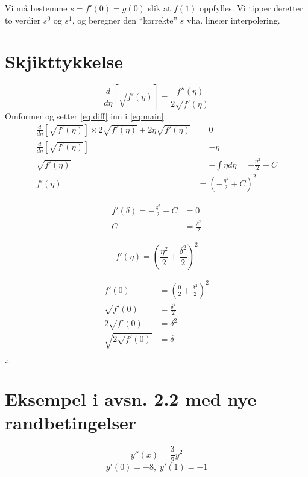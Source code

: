 Vi må bestemme $s = f'(0) = g(0)$ slik at $f(1)$ oppfylles. Vi tipper deretter to verdier $s^0$ og $s^1$, og beregner den ``korrekte'' $s$ vha. lineær interpolering.


\section{Skjikttykkelse} %
\label{sec:skjikttykkelse}

\begin{equation}
  \frac{d}{d\eta}\left[ \sqrt{f'(\eta)} \right] = \frac{f''(\eta)}{2\sqrt{f'(\eta)}}
  \label{eq:diff}
\end{equation}
Omformer og setter \eqref{eq:diff} inn i \eqref{eq:main}:
\begin{align}
  \frac{d}{d\eta}\left[ \sqrt{f'(\eta)} \right] \times 2\sqrt{f'(\eta)} + 2\eta \sqrt{f'(\eta)} &= 0 \nonumber \\
   \frac{d}{d\eta}\left[ \sqrt{f'(\eta)} \right] &= - \eta \nonumber \\
   \sqrt{f'(\eta)} &= -\int \eta d\eta = - \frac{\eta^2}{2} + C \nonumber \\
   f'(\eta) &= \left( - \frac{\eta^2}{2} + C \right)^2
\end{align}

\begin{align}
  f'(\delta) = - \frac{\delta^2}{2} + C &= 0 \nonumber \\
  C &= \frac{\delta^2}{2}
\end{align}

\begin{equation}
  f'(\eta) = \left( \frac{\eta^2}{2} + \frac{\delta^2}{2} \right)^2
\end{equation}

\begin{align}
  f'(0) &= \left( \frac{0}{2} + \frac{\delta^2}{2} \right)^2 \nonumber \\
  \sqrt{f'(0)} &= \frac{\delta^2}{2} \nonumber \\
  2\sqrt{f'(0)} &= \delta^2 \nonumber \\
  \sqrt{2\sqrt{f'(0)}} &= \delta
\end{align}

$\therefore$

\section{Eksempel i avsn. 2.2 med nye randbetingelser} %
\label{sec:eksempel_i_avsn_2_2_med_nye_randbetingelser}
\begin{equation}
  y''(x) = \frac{3}{2} y^2 \label{eq:main2}
\end{equation}
\begin{equation}
  y'(0) = -8, \; y'(1) = -1 \nonumber
\end{equation}

